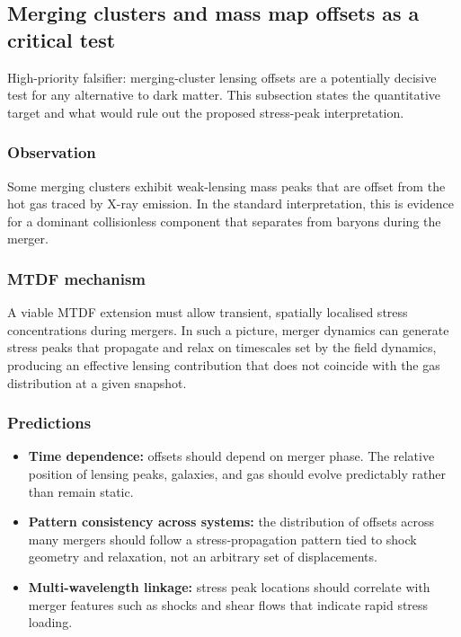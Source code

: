 \documentclass[11pt,a4paper]{article}
\begin{document}
\subsection{Merging clusters and mass map offsets as a critical test}
\begin{mdframed}[linecolor=accent,linewidth=0.5pt,backgroundcolor=callout-bg,leftline=true,rightline=true,topline=true,bottomline=true,innerleftmargin=8pt,innerrightmargin=8pt,innertopmargin=6pt,innerbottommargin=6pt]
High-priority falsifier: merging-cluster lensing offsets are a potentially decisive test for any alternative to dark matter. This subsection states the quantitative target and what would rule out the proposed stress-peak interpretation.
\end{mdframed}

\subsubsection{Observation}
Some merging clusters exhibit weak-lensing mass peaks that are offset from the hot gas traced by X-ray emission. In the standard interpretation, this is evidence for
a dominant collisionless component that separates from baryons during the merger.

\subsubsection{MTDF mechanism}
A viable MTDF extension must allow transient, spatially localised stress concentrations during mergers. In such a picture, merger dynamics can generate stress peaks that
propagate and relax on timescales set by the field dynamics, producing an effective lensing contribution that does not coincide with the gas distribution at a given snapshot.

\subsubsection{Predictions}
\begin{itemize}
  \item \textbf{Time dependence:} offsets should depend on merger phase. The relative position of lensing peaks, galaxies, and gas should evolve predictably rather than remain static.
  \item \textbf{Pattern consistency across systems:} the distribution of offsets across many mergers should follow a stress-propagation pattern tied to shock geometry and relaxation, not an arbitrary set of displacements.
  \item \textbf{Multi-wavelength linkage:} stress peak locations should correlate with merger features such as shocks and shear flows that indicate rapid stress loading.
\end{itemize}
\end{document}
